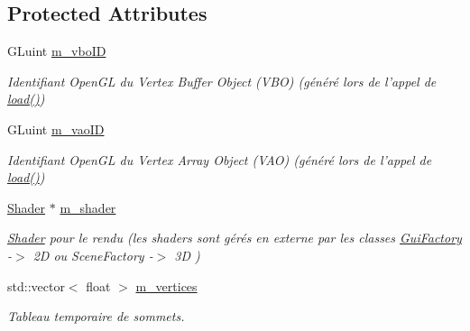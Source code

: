 \subsection*{Protected Attributes}
\begin{DoxyCompactItemize}
\item 
\hypertarget{classAbstractGraphicObject_a7e1566fbd2b769d12dc43ed9a4dd61f1}{G\+Luint \hyperlink{classAbstractGraphicObject_a7e1566fbd2b769d12dc43ed9a4dd61f1}{m\+\_\+vbo\+I\+D}}\label{classAbstractGraphicObject_a7e1566fbd2b769d12dc43ed9a4dd61f1}

\begin{DoxyCompactList}\small\item\em Identifiant Open\+G\+L du Vertex Buffer Object (V\+B\+O) (généré lors de l'appel de \hyperlink{classAbstractGraphicObject_ae0e201a972ea7e97b032bf21f75390a7}{load()}) \end{DoxyCompactList}\item 
\hypertarget{classAbstractGraphicObject_aa0fd0c978efb2e99ef3393afcb779313}{G\+Luint \hyperlink{classAbstractGraphicObject_aa0fd0c978efb2e99ef3393afcb779313}{m\+\_\+vao\+I\+D}}\label{classAbstractGraphicObject_aa0fd0c978efb2e99ef3393afcb779313}

\begin{DoxyCompactList}\small\item\em Identifiant Open\+G\+L du Vertex Array Object (V\+A\+O) (généré lors de l'appel de \hyperlink{classAbstractGraphicObject_ae0e201a972ea7e97b032bf21f75390a7}{load()}) \end{DoxyCompactList}\item 
\hypertarget{classAbstractGraphicObject_a75da74184185de4e01d232a92a2d2b68}{\hyperlink{classShader}{Shader} $\ast$ \hyperlink{classAbstractGraphicObject_a75da74184185de4e01d232a92a2d2b68}{m\+\_\+shader}}\label{classAbstractGraphicObject_a75da74184185de4e01d232a92a2d2b68}

\begin{DoxyCompactList}\small\item\em \hyperlink{classShader}{Shader} pour le rendu (les shaders sont gérés en externe par les classes \hyperlink{classGuiFactory}{Gui\+Factory} -\/$>$ 2\+D ou Scene\+Factory -\/$>$ 3\+D ) \end{DoxyCompactList}\item 
\hypertarget{classAbstractGraphicObject_a302995e5cd2cc5565fbe631194e967e1}{std\+::vector$<$ float $>$ \hyperlink{classAbstractGraphicObject_a302995e5cd2cc5565fbe631194e967e1}{m\+\_\+vertices}}\label{classAbstractGraphicObject_a302995e5cd2cc5565fbe631194e967e1}

\begin{DoxyCompactList}\small\item\em Tableau temporaire de sommets. \end{DoxyCompactList}\end{DoxyCompactItemize}


